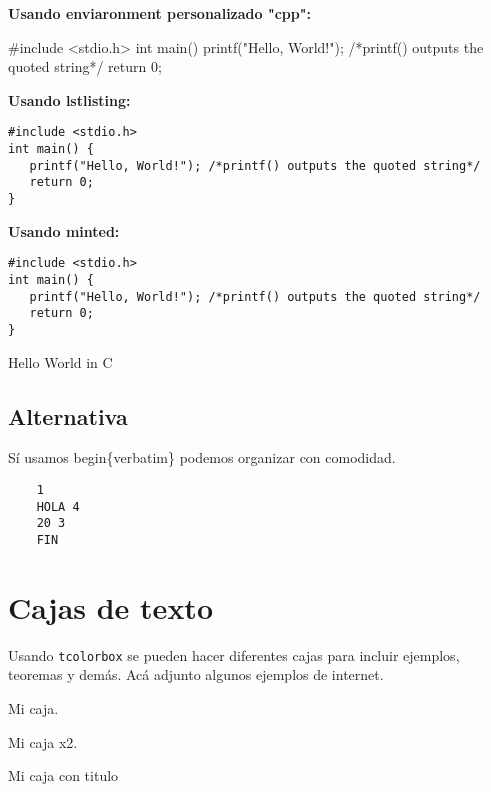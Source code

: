 \documentclass[../main.tex]{subfiles}
\begin{document}
\textbf{Usando enviaronment personalizado "cpp":}
\begin{ccode}
#include <stdio.h>
int main() {
   printf("Hello, World!"); /*printf() outputs the quoted string*/
   return 0;
}
\end{ccode}

\textbf{Usando lstlisting:}
\begin{lstlisting}
#include <stdio.h>
int main() {
   printf("Hello, World!"); /*printf() outputs the quoted string*/
   return 0;
}
\end{lstlisting}

\textbf{Usando minted:}
\begin{listing}[!h]
\begin{verbatim}
#include <stdio.h>
int main() {
   printf("Hello, World!"); /*printf() outputs the quoted string*/
   return 0;
}
\end{verbatim}
\caption{Hello World in C}
\end{listing}

\subsection{Alternativa}
Sí usamos begin\{verbatim\} podemos organizar con comodidad.
\begin{verbatim}
    1
    HOLA 4
    20 3
    FIN
\end{verbatim}


\newpage
\section{Cajas de texto}
Usando \texttt{tcolorbox} se pueden hacer diferentes cajas para incluir ejemplos, teoremas y demás. Acá adjunto algunos ejemplos de internet.

\begin{tcolorbox}
  Mi caja.
\end{tcolorbox}

\begin{tcolorbox}[colback=red!5!white,colframe=red!75!black]
  Mi caja x2.
\end{tcolorbox}

\begin{tcolorbox}[colback=blue!5!white,colframe=blue!75!black,title=Mi titulo]
  Mi caja con titulo
\end{tcolorbox}
\end{document}
